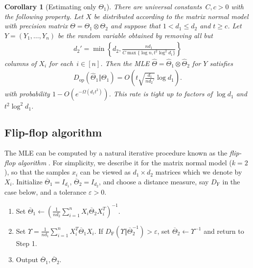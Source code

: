 \documentclass[aos]{imsart}
\newtheorem{corollary}[theorem]{Corollary}
\theoremstyle{definition}
\numberwithin{equation}{section}
\newcommand{\htheta}{\widehat{\Theta}}
\newcommand{\ot}{\otimes}
\newcommand{\eps}{\varepsilon}
\newcommand{\samp}{x}
\newcommand{\DF}{D_{\operatorname{F}}}
\newcommand{\Dop}{D_{\operatorname{op}}}
\begin{document}
\begin{corollary}[Estimating only $\Theta_1$]
There are universal constants~$C, c>0$ with the following property.
Let $X$ be distributed according to the matrix normal model with precision matrix $\Theta = \Theta_1 \ot \Theta_2$ and suppose that $1 < d_1 \leq d_2$ and $t\geq c$.
Let $Y = (Y_1, \dots, Y_n)$ be the random variable obtained by removing all but
\begin{align*}
  d_2' = \min \left\{ d_2, \frac{nd_1}{C \max \{ \log n, t^2 \log^2 d_1 \}} \right\}
\end{align*}
columns of $X_i$ for each~$i \in [n]$.
Then the MLE $\htheta = \htheta_1 \ot \htheta_2$ for $Y$ satisfies
\begin{align*}
  \Dop(\widehat{\Theta}_1 \Vert \Theta_1) = O\left(t \sqrt{\frac{d_1}{nd_2'}} \log d_1\right).
  \end{align*}
 with probability $1 - O(e^{ - \Omega( d_1 t^2)})$.
 This rate is tight up to factors of $\log d_1$ and $t^2 \log^2 d_1$.
\end{corollary}


\subsection{Flip-flop algorithm}\label{subsec:flip-flop}
The MLE can be computed by a natural iterative procedure known as the \emph{flip-flop algorithm} \citep{dutilleul1999mle,gurvits2004classical}. For simplicity, we describe it for the matrix normal model ($k=2$), so that the samples $\samp_i$ can be viewed as $d_1\times d_2$ matrices which we denote by $X_i$.
Initialize $\overline{\Theta}_1 = I_{d_1}$, $\overline{\Theta}_2 = I_{d_2}$, and choose a distance measure, say $\DF$ in the case below, and a tolerance $\eps > 0$.
\begin{enumerate}
\item Set $\overline{\Theta}_1 \leftarrow (\frac{1}{n d_2} \sum_{i = 1}^n X_i \overline{\Theta}_2 X_i^T)^{-1}.$
\item\label{it:sinkhorn second} Set $\Upsilon = \frac{1}{n d_1} \sum_{i = 1}^n X_i^T \overline{\Theta}_1 X_i$.
If $\DF( \Upsilon \Vert  \overline{\Theta}_2^{-1}) > \eps$, set $\overline{\Theta}_2 \leftarrow \Upsilon^{-1}$ and return to Step 1.
\item Output $\overline{\Theta}_1, \overline{\Theta}_2$.
\end{enumerate}
\end{document}
